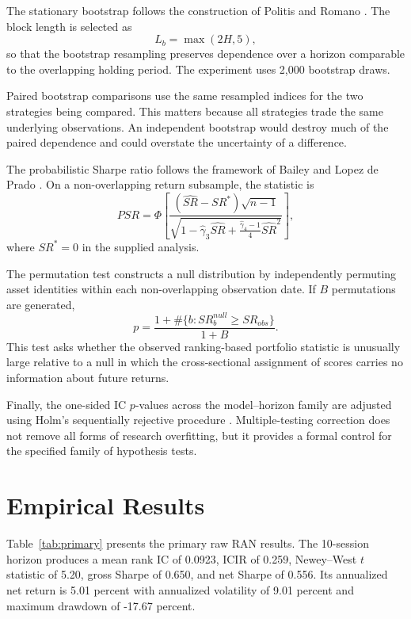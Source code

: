 \documentclass[10pt]{article}
\begin{document}
The stationary bootstrap follows the construction of Politis and Romano \citep{politisromano1994}. The block length is selected as
\begin{equation}
L_b=\max(2H,5),
\end{equation}
so that the bootstrap resampling preserves dependence over a horizon comparable to the overlapping holding period. The experiment uses 2,000 bootstrap draws.

Paired bootstrap comparisons use the same resampled indices for the two strategies being compared. This matters because all strategies trade the same underlying observations. An independent bootstrap would destroy much of the paired dependence and could overstate the uncertainty of a difference.

The probabilistic Sharpe ratio follows the framework of Bailey and Lopez de Prado \citep{bailey2012}. On a non-overlapping return subsample, the statistic is
\begin{equation}
PSR=
\Phi
\left[
\frac{
(\widehat{SR}-SR^\ast)\sqrt{n-1}
}{
\sqrt{
1-\hat\gamma_3\widehat{SR}
+
\frac{\hat\gamma_4-1}{4}\widehat{SR}^2
}
}
\right],
\end{equation}
where $SR^\ast=0$ in the supplied analysis.

The permutation test constructs a null distribution by independently permuting asset identities within each non-overlapping observation date. If $B$ permutations are generated,
\begin{equation}
p=
\frac{
1+\#\{b:SR_b^{null}\geq SR_{obs}\}
}{
1+B
}.
\end{equation}
This test asks whether the observed ranking-based portfolio statistic is unusually large relative to a null in which the cross-sectional assignment of scores carries no information about future returns.

Finally, the one-sided IC $p$-values across the model--horizon family are adjusted using Holm's sequentially rejective procedure \citep{holm1979}. Multiple-testing correction does not remove all forms of research overfitting, but it provides a formal control for the specified family of hypothesis tests.

\section{Empirical Results}

Table~\ref{tab:primary} presents the primary raw RAN results. The 10-session horizon produces a mean rank IC of 0.0923, ICIR of 0.259, Newey--West $t$ statistic of 5.20, gross Sharpe of 0.650, and net Sharpe of 0.556. Its annualized net return is 5.01 percent with annualized volatility of 9.01 percent and maximum drawdown of -17.67 percent.
\end{document}
